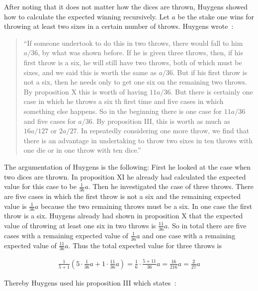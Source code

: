 After noting that it does not matter how the dices are thrown, Huygens showed how to calculate the expected winning recursively. Let $a$ be the stake one wins for throwing at least two sixes in a certain number of throws. Huygens wrote~\cite[p. 163]{bernoulli}:

\begin{quote}
  ``If someone undertook to do this in two throws, there would fall to him $a/36$, by what was shown before. If he is given three throws, then, if his first throw is a six, he will still have two throws, both of which must be sixes, and we said this is worth the same as $a/36$. But if his first throw is not a six, then he needs only to get one six on the remaining two throws. By proposition X this is worth of having $11a/36$. But there is certainly one case in which he throws a six th first time and five cases in which something else happens. So in the beginning there is one case for $11a/36$ and five cases for $a/36$. By proposition III, this is worth as much as $16a/127$ or $2a/27$. In repeatedly considering one more throw, we find that there is an advantage in undertaking to throw two sixes in ten throws with one die or in one throw with ten dice.''
\end{quote}


The argumentation of Huygens is the following: First he looked at the case when two dices are thrown. In proposition XI he already had calculated the expected value for this case to be $\tfrac 1{36}a$. Then he investigated the case of three throws. There are five cases in which the first throw is not a six and the remaining expected value is $\tfrac 1{36}a$ because the two remaining throws must be a six. In one case the first throw is a six. Huygens already had shown in proposition X that the expected value of throwing at least one six in two throws is $\tfrac{11}{36}a$. So in total there are five cases with a remaining expected value of $\tfrac 1{36}a$ and one case with a remaining expected value of $\tfrac{11}{36} a$. Thus the total expected value for three throws is

\begin{align}
  \frac{1}{5+1} \left(5 \cdot \frac 1{36} a + 1 \cdot \frac{11}{36} a \right) = \frac{1}{6} \cdot \frac{5+11}{36} a = \frac{16}{216} a = \frac{2}{27} a
\end{align}

\noindent Thereby Huygens used his proposition III which states~\cite[p. 135]{bernoulli}:


